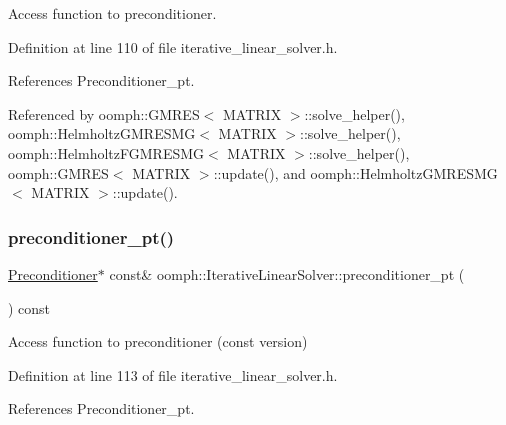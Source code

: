 Access function to preconditioner. 



Definition at line 110 of file iterative\+\_\+linear\+\_\+solver.\+h.



References Preconditioner\+\_\+pt.



Referenced by oomph\+::\+G\+M\+R\+E\+S$<$ M\+A\+T\+R\+I\+X $>$\+::solve\+\_\+helper(), oomph\+::\+Helmholtz\+G\+M\+R\+E\+S\+M\+G$<$ M\+A\+T\+R\+I\+X $>$\+::solve\+\_\+helper(), oomph\+::\+Helmholtz\+F\+G\+M\+R\+E\+S\+M\+G$<$ M\+A\+T\+R\+I\+X $>$\+::solve\+\_\+helper(), oomph\+::\+G\+M\+R\+E\+S$<$ M\+A\+T\+R\+I\+X $>$\+::update(), and oomph\+::\+Helmholtz\+G\+M\+R\+E\+S\+M\+G$<$ M\+A\+T\+R\+I\+X $>$\+::update().

\mbox{\label{classoomph_1_1IterativeLinearSolver_a40dc3e8bcb0ca6963d91b7c999d9b0c6}} 
\subsubsection{\texorpdfstring{preconditioner\+\_\+pt()}{preconditioner\_pt()}\hspace{0.1cm}{\footnotesize\ttfamily [2/2]}}
{\footnotesize\ttfamily \hyperlink{classoomph_1_1Preconditioner}{Preconditioner}$\ast$ const\& oomph\+::\+Iterative\+Linear\+Solver\+::preconditioner\+\_\+pt (\begin{DoxyParamCaption}{ }\end{DoxyParamCaption}) const\hspace{0.3cm}{\ttfamily [inline]}}



Access function to preconditioner (const version) 



Definition at line 113 of file iterative\+\_\+linear\+\_\+solver.\+h.



References Preconditioner\+\_\+pt.

\mbox{\label{classoomph_1_1IterativeLinearSolver_a87eb959944a3e8efa467d60aed43a0d3}} 
